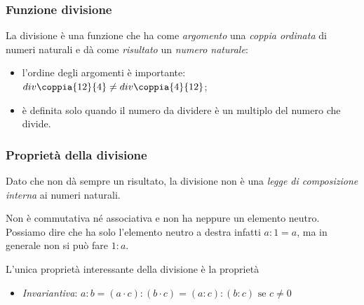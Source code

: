 \subsubsection{Funzione divisione}

La divisione è una funzione che ha come \emph{argomento} una \emph{coppia 
ordinata} di numeri naturali e dà come \emph{risultato} un \emph{numero 
naturale}:

\vspace{.5em}

\begin{osservazioni}{}{}
\begin{itemize} [nosep]
\item l'ordine degli argomenti è importante: 
\(div \coppia{12}{4} \neq div \coppia{4}{12}\);
\item è definita solo quando il numero da dividere è 
un multiplo del numero che divide.
\end{itemize}
\end{osservazioni}

\subsubsection{Proprietà della divisione}

Dato che non dà sempre un risultato, la divisione non è una 
\emph{legge di composizione interna} ai numeri naturali. 

Non è commutativa né associativa e non ha neppure un elemento neutro.
Possiamo dire che ha solo l'elemento neutro a destra infatti \(a : 1 = a\), 
ma in generale non si può fare \(1 : a\).

L'unica proprietà interessante della divisione è la 
proprietà
\begin{itemize} [noitemsep]
\item \emph{Invariantiva}: 
\(a : b = (a \cdot c) : (b \cdot c) = (a : c) : (b : c) \text{ se } 
c \neq 0\)
\end{itemize}

